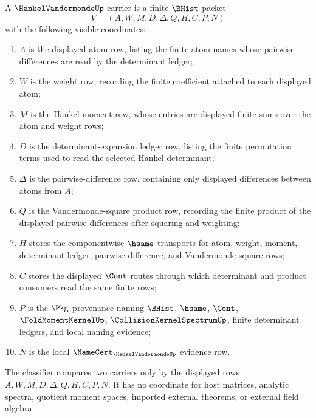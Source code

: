 \begin{definition}
\label{def:hankel-vandermonde-carrier}
A $\HankelVandermondeUp$ carrier is a finite $\BHist$ packet
$$
V=(A,W,M,D,\Delta,Q,H,C,P,N)
$$
with the following visible coordinates:
\begin{enumerate}
\item $A$ is the displayed atom row, listing the finite atom names whose pairwise differences are read by the determinant ledger;
\item $W$ is the weight row, recording the finite coefficient attached to each displayed atom;
\item $M$ is the Hankel moment row, whose entries are displayed finite sums over the atom and weight rows;
\item $D$ is the determinant-expansion ledger row, listing the finite permutation terms used to read the selected Hankel determinant;
\item $\Delta$ is the pairwise-difference row, containing only displayed differences between atoms from $A$;
\item $Q$ is the Vandermonde-square product row, recording the finite product of the displayed pairwise differences after squaring and weighting;
\item $H$ stores the componentwise $\hsame$ transports for atom, weight, moment, determinant-ledger, pairwise-difference, and Vandermonde-square rows;
\item $C$ stores the displayed $\Cont$ routes through which determinant and product consumers read the same finite rows;
\item $P$ is the $\Pkg$ provenance naming $\BHist$, $\hsame$, $\Cont$, $\FoldMomentKernelUp$, $\CollisionKernelSpectrumUp$, finite determinant ledgers, and local naming evidence;
\item $N$ is the local $\NameCert_{\HankelVandermondeUp}$ evidence row.
\end{enumerate}
The classifier compares two carriers only by the displayed rows $A,W,M,D,\Delta,Q,H,C,P,N$. It has no coordinate for host matrices, analytic spectra, quotient moment spaces, imported external theorems, or external field algebra.
\end{definition}

